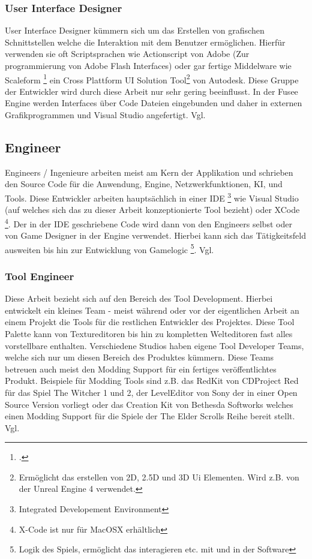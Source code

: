 \documentclass[pagesize, paper=a4, fontsize=12pt, titlepage=true, headings=small, headnosepline, abstractoff, liststotoc, nochapterprefix, plainheadsepline, twoside]{scrreprt}
\begin{document}
\subsubsection{User Interface Designer}
User Interface Designer kümmern sich um das Erstellen von grafischen Schnittstellen welche die Interaktion mit dem Benutzer ermöglichen. Hierfür verwenden sie oft Scriptsprachen wie Actionscript von Adobe (Zur programmierung von Adobe Flash Interfaces) oder gar fertige Middelware wie Scaleform \footcite{AutodeskScale2014} ein Cross Plattform UI Solution Tool\footnote{Ermöglicht das erstellen von 2D, 2.5D und 3D Ui Elementen. Wird z.B. von der Unreal Engine 4 verwendet.} von Autodesk. Diese Gruppe der Entwickler wird durch diese Arbeit nur sehr gering beeinflusst. In der Fusee Engine werden Interfaces über Code Dateien eingebunden und daher in externen Grafikprogrammen und Visual Studio angefertigt. Vgl. \autocite[S. 31]{Chandler2006}

\subsection{Engineer}
Engineers / Ingenieure arbeiten meist am Kern der Applikation und schrieben den Source Code für die Anwendung, Engine, Netzwerkfunktionen, KI, und Tools. Diese Entwickler arbeiten hauptsächlich in einer IDE \footnote{Integrated Developement Environment} wie Visual Studio (auf welches sich das zu dieser Arbeit konzeptionierte Tool bezieht) oder XCode \footnote{X-Code ist nur für MacOSX erhältlich}. Der in der IDE geschriebene Code wird dann von den Engineers selbst oder von Game Designer in der Engine verwendet. Hierbei kann sich das Tätigkeitsfeld ausweiten bis hin zur Entwicklung von Gamelogic \footnote{Logik des Spiels, ermöglicht das interagieren etc. mit und in der Software}. Vgl. \autocite[S. 26]{Chandler2006}

\subsubsection{Tool Engineer}
Diese Arbeit bezieht sich auf den Bereich des Tool Development. Hierbei entwickelt ein kleines Team - meist während oder vor der eigentlichen Arbeit an einem Projekt die Tools für die restlichen Entwickler des Projektes. Diese Tool Palette kann von Textureditoren bis hin zu kompletten Welteditoren fast alles vorstellbare enthalten. Verschiedene Studios haben eigene Tool Developer Teams, welche sich nur um diesen Bereich des Produktes kümmern. Diese Teams betreuen auch meist den Modding Support für ein fertiges veröffentlichtes Produkt. Beispiele für Modding Tools sind z.B. das RedKit von CDProject Red für das Spiel The Witcher 1 und 2, der LevelEditor von Sony der in einer Open Source Version vorliegt oder das Creation Kit von Bethesda Softworks welches einen Modding Support für die Spiele der The Elder Scrolls Reihe bereit stellt. Vgl. \autocite[S. 27 ]{Chandler2006}
\end{document}
